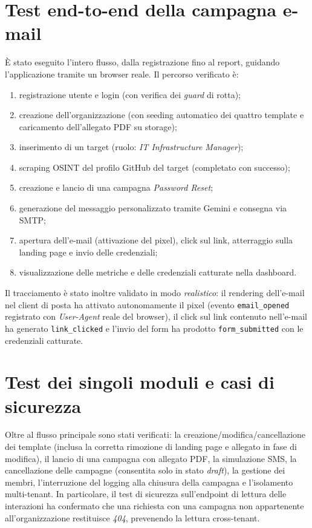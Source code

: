 \documentclass[12pt,a4paper,oneside]{report}
\newcommand{\code}[1]{\texttt{\small #1}}
\begin{document}
\section{Test end-to-end della campagna e-mail}
\`E stato eseguito l'intero flusso, dalla registrazione fino al report, guidando
l'applicazione tramite un browser reale. Il percorso verificato \`e:
\begin{enumerate}[nosep]
  \item registrazione utente e login (con verifica dei \emph{guard} di rotta);
  \item creazione dell'organizzazione (con seeding automatico dei quattro template e
        caricamento dell'allegato PDF su storage);
  \item inserimento di un target (ruolo: \emph{IT Infrastructure Manager});
  \item scraping OSINT del profilo GitHub del target (completato con successo);
  \item creazione e lancio di una campagna \emph{Password Reset};
  \item generazione del messaggio personalizzato tramite Gemini e consegna via SMTP;
  \item apertura dell'e-mail (attivazione del pixel), click sul link, atterraggio sulla
        landing page e invio delle credenziali;
  \item visualizzazione delle metriche e delle credenziali catturate nella dashboard.
\end{enumerate}

Il tracciamento \`e stato inoltre validato in modo \emph{realistico}: il rendering
dell'e-mail nel client di posta ha attivato autonomamente il pixel (evento
\code{email\_opened} registrato con \emph{User-Agent} reale del browser), il click sul link
contenuto nell'e-mail ha generato \code{link\_clicked} e l'invio del form ha prodotto
\code{form\_submitted} con le credenziali catturate.

\section{Test dei singoli moduli e casi di sicurezza}
Oltre al flusso principale sono stati verificati: la creazione/modifica/cancellazione dei
template (inclusa la corretta rimozione di landing page e allegato in fase di modifica), il
lancio di una campagna con allegato PDF, la simulazione SMS, la cancellazione delle campagne
(consentita solo in stato \emph{draft}), la gestione dei membri, l'interruzione del
logging alla chiusura della campagna e l'isolamento multi-tenant. In particolare, il test di
sicurezza sull'endpoint di lettura delle interazioni ha confermato che una richiesta con
una campagna non appartenente all'organizzazione restituisce \emph{404}, prevenendo la
lettura cross-tenant.
\end{document}

